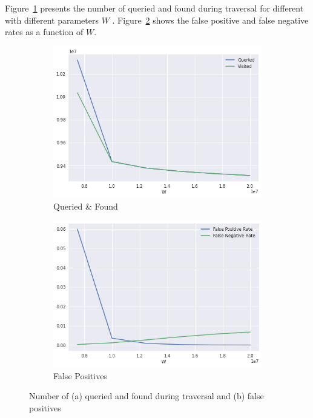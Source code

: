 Figure~\ref{fig:ecoli-art-traversal-W-queriedfound} presents the number of  queried and found during traversal for different \dBCM with different parameters $W$ . Figure~\ref{fig:ecoli-art-traversal-W-fpfn} shows the false positive and false negative rates as a function of $W$.

\begin{figure}[htbp]
	\centering
    \begin{subfigure}{.5\textwidth}
        \centering
        \includegraphics[width=\textwidth]{figures/e_coli-dbcm-queried_and_found-K31-D8-T40}
        \caption{Queried \& Found}\label{fig:ecoli-art-traversal-W-queriedfound}
    \end{subfigure}%
    \begin{subfigure}{.5\textwidth}
        \centering
        \includegraphics[width=\textwidth]{figures/e_coli-dbcm-false_positive_and_negative_rates-K31-D8-T40}
        \caption{False Positives}\label{fig:ecoli-art-traversal-W-fpfn}
    \end{subfigure}
	\caption{Number of (a)  queried and found during traversal and (b) false positives}\label{fig:ecoli-art-traversal-W}
\end{figure}

